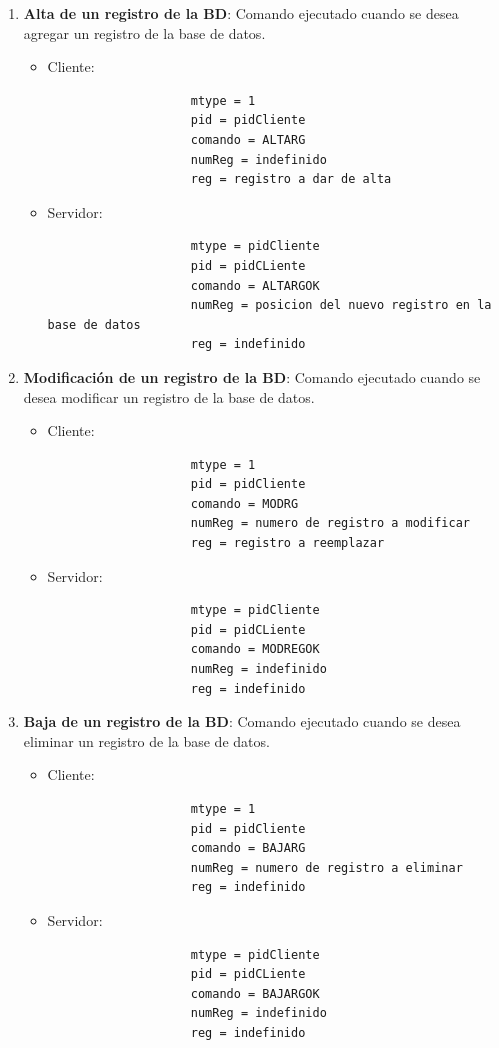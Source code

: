 \documentclass[a4paper,10pt]{article}
\begin{document}
\begin{enumerate}
		\item{\bf Alta de un registro de la BD}: Comando ejecutado cuando se desea agregar un registro de la base de datos.
			\begin{itemize}
				\item Cliente:
				\begin{verbatim}
					mtype = 1
					pid = pidCliente
					comando = ALTARG 
					numReg = indefinido
					reg = registro a dar de alta
				\end{verbatim}
				\item Servidor:
				\begin{verbatim}
					mtype = pidCliente 
					pid = pidCLiente
					comando = ALTARGOK
					numReg = posicion del nuevo registro en la base de datos
					reg = indefinido
				\end{verbatim}
			\end{itemize}

		\item{\bf Modificaci\'on de un registro de la BD}: Comando ejecutado cuando se desea modificar un registro de la base de datos.
			\begin{itemize}
				\item Cliente:
				\begin{verbatim}
					mtype = 1
					pid = pidCliente
					comando = MODRG 
					numReg = numero de registro a modificar
					reg = registro a reemplazar
				\end{verbatim}
				\item Servidor:
				\begin{verbatim}
					mtype = pidCliente 
					pid = pidCLiente
					comando = MODREGOK
					numReg = indefinido
					reg = indefinido
				\end{verbatim}
			\end{itemize}

		\item{\bf Baja de un registro de la BD}: Comando ejecutado cuando se desea eliminar un registro de la base de datos.
			\begin{itemize}
				\item Cliente:
				\begin{verbatim}
					mtype = 1
					pid = pidCliente
					comando = BAJARG 
					numReg = numero de registro a eliminar
					reg = indefinido
				\end{verbatim}
				\item Servidor:
				\begin{verbatim}
					mtype = pidCliente 
					pid = pidCLiente
					comando = BAJARGOK
					numReg = indefinido
					reg = indefinido
				\end{verbatim}
			\end{itemize}
		\end{enumerate}
\end{document}
